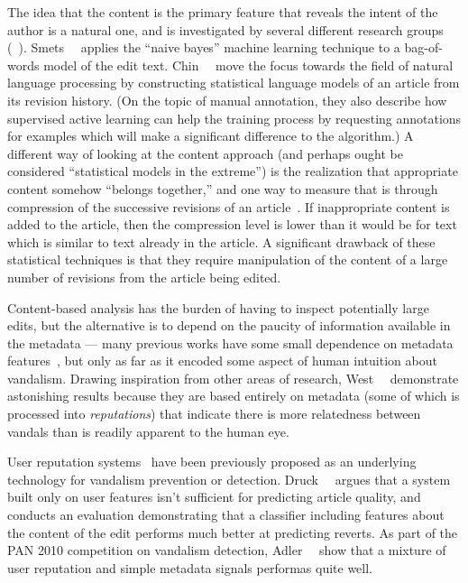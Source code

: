 The idea that the content is the primary feature that reveals
the intent of the author is a natural one, and is investigated
by several different research groups
(\eg~\cite{Potthast2008,Smets2008,Druck2008,Itakura2009,Chin2010}).
Smets~\etal~\cite{Smets2008} applies the ``naive bayes'' machine
learning technique to a bag-of-words model of the edit text.
Chin~\etal~\cite{Chin2010} move the focus towards the field of natural
language processing by constructing statistical language models of an
article from its revision history.
(On the topic of manual annotation, they also describe how supervised
active learning can help the training process by requesting
annotations for examples which will make a significant difference to
the algorithm.)
A different way of looking at the content approach (and perhaps ought
be considered ``statistical models in the extreme'') is the
realization that appropriate content somehow ``belongs together,'' and
one way to measure that is through compression of the successive
revisions of an article~\cite{Smets2008,Itakura2009}.
If inappropriate content is added to the article, then the compression
level is lower than it would be for text which is similar to text
already in the article.
A significant drawback of these statistical techniques is that they
require manipulation of the content of a large number of revisions
from the article being edited.

Content-based analysis has the burden of having to
inspect potentially large edits, but the alternative is to depend
on the paucity of information available in the metadata ---
many previous works have some small dependence on metadata
features~\cite{Potthast2008,Druck2008,Belani2009}, but only
as far as it encoded some aspect of human intuition about vandalism.
Drawing inspiration from other areas of research,
West~\etal~\cite{West2010} demonstrate astonishing results because
they are based entirely on metadata (some of which is processed into
\textit{reputations}) that indicate there is more relatedness between
vandals than is readily apparent to the human eye.

User reputation systems~\cite{WikiTrust06,WikiMTWtrust06,www07}
have been previously proposed as an underlying technology for
vandalism prevention or detection.
Druck~\etal~\cite{Druck2008} argues that a system built only on user
features isn't sufficient for predicting article quality, and conducts
an evaluation demonstrating that a classifier including features about
the content of the edit performs much better at predicting reverts.
As part of the PAN 2010 competition on vandalism detection,
Adler~\etal~\cite{Adler2010} show that a mixture of user reputation
and simple metadata signals performas quite well.

